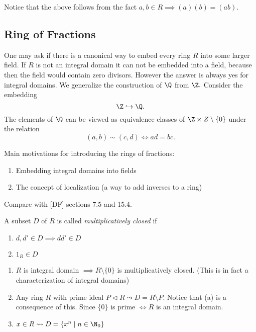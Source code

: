 \documentclass[master.tex]{subfiles}
\begin{document}
  Notice that the above follows from the fact \(a,b \in R \implies (a)(b)=(ab)\).

  \subsection{Ring of Fractions}
  One may ask if there is a canonical way to embed every ring \(R\) into some larger field. If \(R\) is not an integral
  domain it can not be embedded into a field, because then the field would contain zero divisors. However the answer is
  always yes for integral domains.  We generalize the construction of \(\Q\) from \(\Z.\) Consider the embedding
  \[\Z \hookrightarrow \Q.\]
  The elements of \(\Q\) can be viewed as equivalence classes of \(\Z \times Z \setminus \{0\}\) under the relation
  \[(a,b) \sim (c,d) \iff ad=bc.\]

  Main motivations for introducing the rings of fractions:
  \begin{enumerate}
  \item Embedding integral domains into fields
  \item The concept of localization (a way to add inverses to a ring)
  \end{enumerate}

  Compare with [DF] sections 7.5 and 15.4.

  \begin{defn}
    A subset \(D\) of \(R\) is called \emph{multiplicatively closed} if
    \begin{enumerate}[label=(\arabic*)]
    \item \(d,d' \in D \implies dd' \in D\)
    \item \(1_R \in D\)
    \end{enumerate}
  \end{defn}

  \begin{example*}
    \begin{enumerate}[label=(\alph*)]
    \item \(R\) is integral domain \(\implies R \setminus \{0\}\) is multiplicatively closed. (This is in fact a
      characterization of integral domains)
    \item Any ring \(R\) with prime ideal \(P \lhd R \leadsto D = R \setminus P\). Notice that (a) is a consequence of
      this. Since \(\{0\}\) is prime \(\iff R\) is an integral domain.
    \item \(x \in R \leadsto D= \{x^n \mid n \in \N_0\}\)
    \end{enumerate}
  \end{example*}
\end{document}

